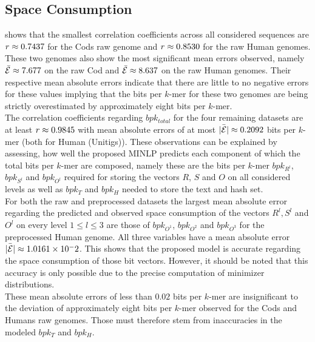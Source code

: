 \documentclass[a4paper,titlepage,onecolumn,oneside,12pt,nenglish,titlepage=firstiscover]{scrbook}
\theoremstyle{plain} %
\theoremstyle{definition} %
\theoremstyle{remark} %
\theoremstyle{plain}
\newcommand{\level}{l}
\begin{document}
\subsection{Space Consumption}
 shows that the smallest correlation coefficients across all considered sequences are $r \approx 0.7437$ for the Cods raw genome and $r \approx 0.8530$ for the raw Human genomes. These two genomes also show the most significant mean errors observed, namely $\bar{\mathcal{E}} \approx 7.677$ on the raw Cod and $\bar{\mathcal{E}} \approx 8.637$ on the raw Human genomes. Their respective mean absolute errors indicate that there are little to no negative errors for these values implying that the bits per $k$-mer for these two genomes are being strictly overestimated by approximately eight bits per $k$-mer.\\
The correlation coefficients regarding $bpk_{total}$ for the four remaining datasets are at least $r \approx 0.9845$ with mean absolute errors of at most $\bar{|\mathcal{E}|} \approx 0.2092$ bits per $k$-mer (both for Human (Unitigs)).
These observations can be explained by assessing, how well the proposed MINLP predicts each component of which the total bits per $k$-mer are composed, namely these are the bits per $k$-mer $bpk_{R^\level}$, $bpk_{S^\level}$ and $bpk_{O^\level}$ required for storing the vectors $R$, $S$ and $O$ on all considered levels as well as $bpk_T$ and $bpk_H$ needed to store the text and hash set.\\

For both the raw and preprocessed datasets the largest mean absolute error regarding the predicted and observed space consumption of the vectors $R^\level, S^\level$ and $O^\level$ on every level $1 \leq \level \leq 3$ are those of $bpk_{O^1}$, $bpk_{O^2}$ and $bpk_{O^3}$ for the preprocessed Human genome. All three variables have a mean absolute error $\bar{|\mathcal{E}|} \approx 1.0161 \times 10^-2$. This shows that the proposed model is accurate regarding the space consumption of those bit vectors. However, it should be noted that this accuracy is only possible due to the precise computation of minimizer distributions.\\
These mean absolute errors of less than $0.02$ bits per $k$-mer are insignificant to the deviation of approximately eight bits per $k$-mer observed for the Cods and Humans raw genomes. Those must therefore stem from inaccuracies in the modeled $bpk_T$ and $bpk_H$.\\
\end{document}
